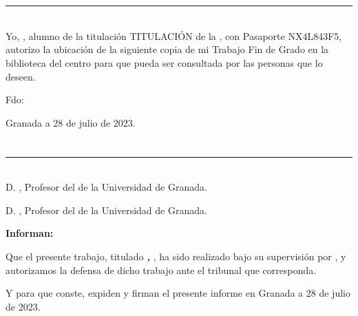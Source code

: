 \chapter*{}
\thispagestyle{empty}

\noindent\rule[-1ex]{\textwidth}{2pt}\\[4.5ex]

Yo, \textbf{\myName}, alumno de la titulación TITULACIÓN de la \textbf{\myFaculty}, 
con Pasaporte NX4L843F5, autorizo la ubicación de la siguiente copia de mi 
Trabajo Fin de Grado en la biblioteca del centro para que pueda ser
consultada por las personas que lo deseen.

\vspace{6cm}

\noindent Fdo: \myName

\vspace{2cm}

\begin{flushright}
Granada a 28 de julio de 2023.
\end{flushright}


\chapter*{}
\thispagestyle{empty}

\noindent\rule[-1ex]{\textwidth}{2pt}\\[4.5ex]

D. \textbf{\myProf}, Profesor del \myDepartment de la Universidad de Granada.

\vspace{0.5cm}

D. \textbf{\myOtherProf}, Profesor del \myDepartment de la Universidad de Granada.


\vspace{0.5cm}

\textbf{Informan:}

\vspace{0.5cm}

Que el presente trabajo, titulado \textit{\textbf{\myTitle, \mySubTitle}},
ha sido realizado bajo su supervisión por \textbf{\myName}, y autorizamos la defensa de dicho trabajo ante el tribunal
que corresponda.

\vspace{0.5cm}

Y para que conste, expiden y firman el presente informe en Granada a 28 de julio de 2023.

\vspace{1cm}

